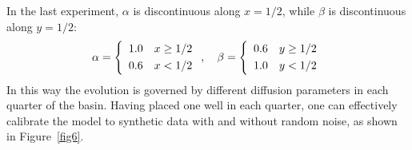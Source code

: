 In the last experiment, $\alpha$ is discontinuous along $x=1/2$, while
$\beta$ is discontinuous along $y=1/2$:
\begin{equation}
 \alpha = \left\{
 \begin{array}{rl} 1.0 & x \ge 1/2 \\[\jot] 0.6 & x < 1/2 \end{array}
 \right .
 , \quad
 \beta = \left\{
 \begin{array}{rl} 0.6 & y \ge 1/2 \\[\jot] 1.0 & y < 1/2 \end{array}
 \right.
\end{equation}
In this way the evolution is governed by different diffusion parameters
in each quarter of the basin.  Having placed one well in each quarter,
one can effectively calibrate the model to synthetic data with and
without random noise, as shown in Figure~\ref{fig6}.

